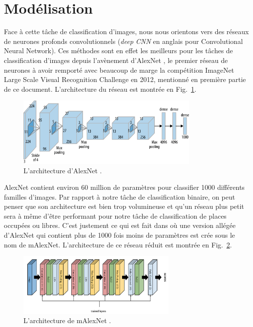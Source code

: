 \documentclass[12pt]{article}
\begin{document}
\section{Modélisation}

Face à cette tâche de classification d'images, nous nous orientons vers des réseaux de neurones profonds convolutionnels (\textit{deep CNN} en anglais pour Convolutional Neural Network). Ces méthodes sont en effet les meilleurs pour les tâches de classification d'images depuis l'avènement d'AlexNet \citep{alexnet}, le premier réseau de neurones à avoir remporté avec beaucoup de marge la compétition ImageNet Large Scale Visual Recognition Challenge en 2012, mentionné en première partie de ce document. L'architecture du réseau est montrée en Fig.~\ref{fig:alexnet}.

\begin{figure}[htbp]
    \centering
    \includegraphics[width=0.8\textwidth]{figures/networks/alexnet.png}
    \caption{L'architecture d'AlexNet \citep{alexnet}.}
    \label{fig:alexnet}
\end{figure}

AlexNet contient environ 60 million de paramètres pour classifier 1000 différents familles d'images. Par rapport à notre tâche de classification binaire, on peut penser que son architecture est bien trop volumineuse et qu'un réseau plus petit sera à même d'être performant pour notre tâche de classification de places occupées ou libres. C'est justement ce qui est fait dans \citep{Amato2017} où une version allégée d'AlexNet qui contient plus de 1000 fois moins de paramètres est crée sous le nom de mAlexNet. L'architecture de ce réseau réduit est montrée en Fig.~\ref{fig:malexnet}.

\begin{figure}[htbp]
    \centering
    \includegraphics[width=0.7\textwidth]{figures/networks/malexnet.png}
    \caption{L'architecture de mAlexNet \citep{Amato2017}.}
    \label{fig:malexnet}
\end{figure}
\end{document}
